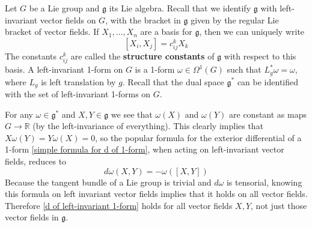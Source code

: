 Let $G$ be a Lie group and $\mathfrak g$ its Lie algebra. Recall that we identify $\mathfrak g$ with left-invariant vector fields on $G$, with the bracket in $\mathfrak g$ given by the regular Lie bracket of vector fields. If $X_1,\ldots,X_n$ are a basis for $\mathfrak g$, then we can uniquely write
\begin{equation}
\label{structure constants}
[X_i,X_j] = c_{ij}^k X_k
\end{equation}
The constants $c_{ij}^k$ are called the \textbf{structure constants} of $\mathfrak g$ with respect to this basis. A left-invariant 1-form on $G$ is a 1-form $\omega \in \Omega^1(G)$ such that $L_g^* \omega = \omega$, where $L_g$ is left translation by $g$. Recall that the dual space $\mathfrak g^*$ can be identified with the set of left-invariant 1-forms on $G$. 

For any $\omega \in \mathfrak g^*$ and $X,Y \in \mathfrak g$ we see that $\omega(X)$ and $\omega(Y)$ are constant as maps $G \rightarrow \mathbb R$ (by the left-invariance of everything). This clearly implies that $X\omega(Y) = Y \omega(X) = 0$, so the popular formula for the exterior differential of a 1-form \eqref{simple formula for d of 1-form}, when acting on left-invariant vector fields, reduces to 
\begin{equation}
\label{d of left-invariant 1-form}
d\omega(X,Y) = -\omega([X,Y])
\end{equation}
Because the tangent bundle of a Lie group is trivial and $d\omega$ is tensorial, knowing this formula on left invariant vector fields implies that it holds on all vector fields. Therefore \eqref{d of left-invariant 1-form} holds for all vector fields $X,Y$, not just those vector fields in $\mathfrak g$.

